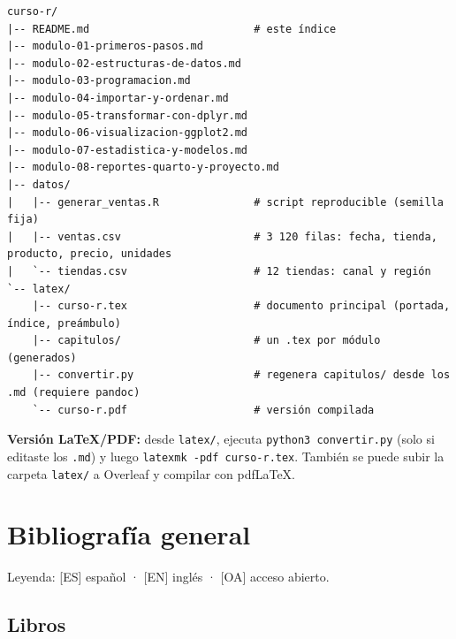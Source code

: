 \begin{lstlisting}
curso-r/
|-- README.md                          # este índice
|-- modulo-01-primeros-pasos.md
|-- modulo-02-estructuras-de-datos.md
|-- modulo-03-programacion.md
|-- modulo-04-importar-y-ordenar.md
|-- modulo-05-transformar-con-dplyr.md
|-- modulo-06-visualizacion-ggplot2.md
|-- modulo-07-estadistica-y-modelos.md
|-- modulo-08-reportes-quarto-y-proyecto.md
|-- datos/
|   |-- generar_ventas.R               # script reproducible (semilla fija)
|   |-- ventas.csv                     # 3 120 filas: fecha, tienda, producto, precio, unidades
|   `-- tiendas.csv                    # 12 tiendas: canal y región
`-- latex/
    |-- curso-r.tex                    # documento principal (portada, índice, preámbulo)
    |-- capitulos/                     # un .tex por módulo (generados)
    |-- convertir.py                   # regenera capitulos/ desde los .md (requiere pandoc)
    `-- curso-r.pdf                    # versión compilada
\end{lstlisting}

\textbf{Versión LaTeX/PDF:} desde \passthrough{\lstinline!latex/!},
ejecuta \passthrough{\lstinline!python3 convertir.py!} (solo si editaste
los \passthrough{\lstinline!.md!}) y luego
\passthrough{\lstinline!latexmk -pdf curso-r.tex!}. También se puede
subir la carpeta \passthrough{\lstinline!latex/!} a Overleaf y compilar
con pdfLaTeX.

\section*{Bibliografía general}

Leyenda: {[}ES{]} español · {[}EN{]} inglés · {[}OA{]} acceso abierto.

\subsection*{Libros}

